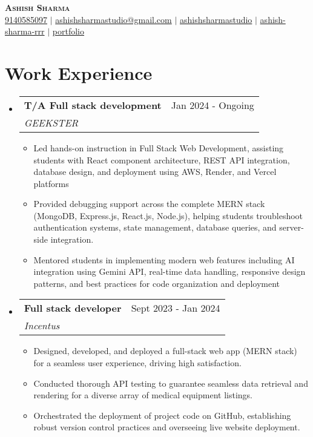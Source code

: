 \documentclass[letterpaper,11pt]{article}
\makeatletter
\newcommand{\resumeItem}[1]{
  \item\small{
    {#1 \vspace{-2pt}}
  }
}
\newcommand{\resumeSubheading}[4]{
  \vspace{-2pt}\item
    \begin{tabular*}{0.97\textwidth}[t]{l@{\extracolsep{\fill}}r}
      \textbf{#1} & #2 \\
      \textit{\small#3} & \textit{\small #4} \\
    \end{tabular*}\vspace{-7pt}
}
\newcommand{\resumeSubHeadingListStart}{\begin{itemize}[leftmargin=0.15in, label={}]}
\newcommand{\resumeSubHeadingListEnd}{\end{itemize}}
\newcommand{\resumeItemListStart}{\begin{itemize}}
\newcommand{\resumeItemListEnd}{\end{itemize}\vspace{-5pt}}
\makeatother
\begin{document}

\begin{center}
   \textbf{\Huge \scshape Ashish Sharma} \\ \vspace{1pt}
    \small 
    \raisebox{-0.05\height}{\faPhone*} \href{tel:+919140585097}{9140585097} $|$ 
    \raisebox{-0.05\height}{\faEnvelope} \href{mailto:ashishsharmastudio@gmail.com}{ashishsharmastudio@gmail.com} $|$ 
    \raisebox{-0.05\height}{\faGithub} \href{https://github.com/ashishsharmastudio}{ashishsharmastudio} $|$ 
    \raisebox{-0.05\height}{\faLinkedin} \href{https://www.linkedin.com/in/ashish-sharma-rrr/}{ashish-sharma-rrr} $|$ 
    \raisebox{-0.05\height}{\faGlobe} \href{https://ashish-sharma-portfolio-phi.vercel.app/}{portfolio}
\end{center}


\section{Work Experience}
  \resumeSubHeadingListStart
\resumeSubheading
      {T/A Full stack development}{Jan 2024 - Ongoing}
      {GEEKSTER}{}
      \resumeItemListStart
      \resumeItem{Led hands-on instruction in Full Stack Web Development, assisting students with React component architecture, REST API integration, database design, and deployment using AWS, Render, and Vercel platforms}
       \resumeItem{Provided debugging support across the complete MERN stack (MongoDB, Express.js, React.js, Node.js), helping students troubleshoot authentication systems, state management, database queries, and server-side integration.}
       \resumeItem{Mentored students in implementing modern web features including AI integration using Gemini API, real-time data handling, responsive design patterns, and best practices for code organization and deployment}
    \resumeItemListEnd
  \resumeSubheading
      {Full stack developer}{Sept 2023 - Jan 2024}
      {Incentus}{}
      \resumeItemListStart
       \resumeItem{Designed, developed, and deployed a full-stack web app (MERN stack) for a seamless user experience, driving high satisfaction.}
        \resumeItem{Conducted thorough API testing to guarantee seamless data retrieval and rendering for a diverse array of medical equipment listings.}
         \resumeItem{Orchestrated the deployment of project code on GitHub, establishing robust version control practices and overseeing live website deployment.}
    \resumeItemListEnd
  \resumeSubHeadingListEnd
\end{document}
